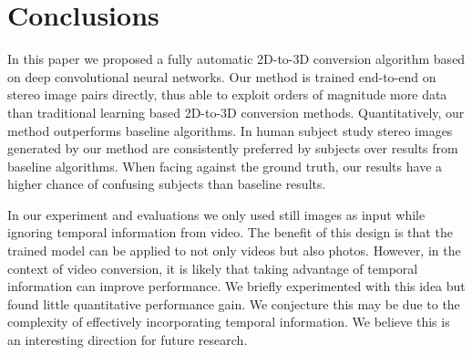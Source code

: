 \documentclass[runningheads]{llncs}
\begin{document}
\section{Conclusions}
In this paper we proposed a fully automatic 2D-to-3D conversion algorithm based on deep convolutional neural networks.
Our method is trained end-to-end on stereo image pairs directly, thus able to exploit orders of magnitude more data than traditional learning based 2D-to-3D conversion methods.
Quantitatively, our method outperforms baseline algorithms.
In human subject study stereo images generated by our method are consistently preferred by subjects over results from baseline algorithms.
When facing against the ground truth, our results have a higher chance of confusing %
subjects than baseline results.

In our experiment and evaluations we only used still images as input while ignoring temporal information from video.
The benefit of this design is that the trained model can be applied to not only videos but also photos.
However, in the context of video conversion, it is likely that taking advantage of temporal information can improve performance.
We briefly experimented with this idea but found little quantitative performance gain.
We conjecture this may be due to the complexity of effectively incorporating temporal information.
We believe this is an interesting direction for future research.



\end{document}
